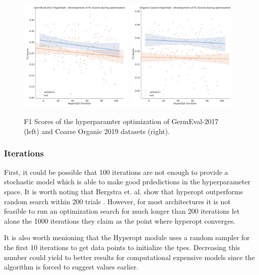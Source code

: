 \begin{figure}[ht]
	\centering
	\includegraphics[width=0.49\textwidth]{figures/06_results/06_hp_ge_lm_f1time}
	\includegraphics[width=0.49\textwidth]{figures/06_results/06_hp_og_lm_f1time}
	\caption{F1 Scores of the hyperparamter optimization of GermEval-2017 {(left)} and Coarse Organic 2019 datasets {(right)}.}
	\label{fig:06_F1GermEvalHp}
\end{figure}

\subsubsection*{Iterations}

First, it could be possible that 100 iterations are not enough to provide a stochastic model which is able to make good prdedictions in the hyperparameter space. It is worth noting that Bergstra et. al. show that hyperopt outperforms random search within 200 trials \cite{Bergstra2013}. However, for most architectures it is not feasible to run an optimization search for much longer than 200 iterations let alone the 1000 iterations they claim as the point where hyperopt converges. 
\medskip

It is also worth menioning that the Hyperopt module uses a random sampler for the first 10 iterations to get data points to initialize the \glspl{tpe}. Decreasing this number could yield to better results for computational expensive models since the algorithm is forced to suggest values earlier.

